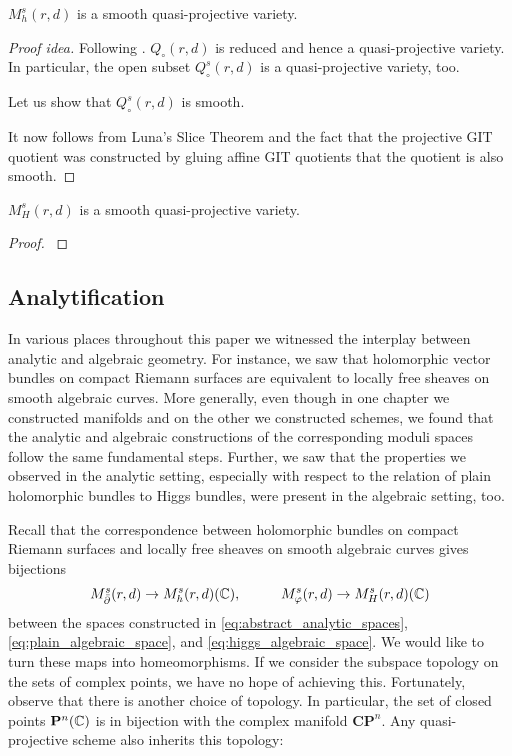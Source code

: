 \documentclass[12pt]{ociamthesis}  %
\begin{document}
\begin{theorem}
  $M^s_h(r,d)$ is a smooth quasi-projective variety.
  \begin{proof}[Proof idea]
    Following \cite[Proposition 8.65]{hoskins2016}.
    $Q_\circ(r,d)$ is reduced and hence a quasi-projective variety.
    In particular, the open subset $Q^s_\circ(r,d)$ is a quasi-projective
    variety, too.
    
    Let us show that $Q^s_\circ(r,d)$ is smooth.
    \missingproof

    It now follows from Luna's Slice Theorem and the fact that the
    projective GIT quotient was constructed by gluing affine GIT quotients
    that the quotient is also smooth.
  \end{proof}
\end{theorem}

\begin{theorem}
  $M^s_H(r,d)$ is a smooth quasi-projective variety.
  \begin{proof}

    \cite[Proposition 7.4]{nitsure1991}
    \missingproof
  \end{proof}
\end{theorem}

\subsection{Analytification}

In various places throughout this paper we witnessed the interplay
between analytic and algebraic geometry. For instance, we saw that
holomorphic vector bundles on compact Riemann surfaces are equivalent
to locally free sheaves on smooth algebraic curves. More generally,
even though in one chapter we constructed manifolds and on the other
we constructed schemes, we found that the analytic and algebraic
constructions of the corresponding moduli spaces follow the same
fundamental steps. Further, we saw that the properties we observed
in the analytic setting, especially with respect to the relation
of plain holomorphic bundles to Higgs bundles, were present in the
algebraic setting, too.

Recall that the correspondence between holomorphic bundles on
compact Riemann surfaces and locally free sheaves on smooth algebraic
curves gives bijections
\begin{align*}
  M^s_{{\bar{\partial}}}(r,d) \to M^s_h(r,d)(\mathbb C), \hspace{1cm}
  M^s_{\varphi}(r,d) \to M^s_H(r,d)(\mathbb C)
\end{align*}
between the spaces constructed in \ref{eq:abstract_analytic_spaces},
\ref{eq:plain_algebraic_space}, and \ref{eq:higgs_algebraic_space}.
We would like to turn these maps into homeomorphisms. If we consider
the subspace topology on the sets of complex points, we have no hope
of achieving this. Fortunately, observe that there is another choice of
topology. In particular, the set of closed points $\mathbf{P}^{n}_{}(\mathbb C)$
is in bijection with the complex manifold $\mathbf{CP}^n$. Any quasi-projective
scheme also inherits this topology:
\end{document}
